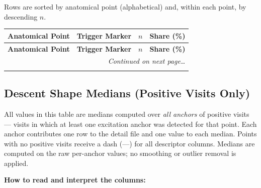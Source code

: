 \documentclass[a4paper,11pt]{article}
\begin{document}
\medskip
\noindent Rows are sorted by anatomical point (alphabetical) and, within each point, by
descending $n$.

\begin{footnotesize}
\begin{longtable}{p{3.5cm}p{7.5cm}rr}
\toprule
\textbf{Anatomical Point} &
\textbf{Trigger Marker} &
\textbf{$n$} &
\textbf{Share (\%)} \\
\midrule
\endfirsthead
\toprule
\textbf{Anatomical Point} &
\textbf{Trigger Marker} &
\textbf{$n$} &
\textbf{Share (\%)} \\
\midrule
\endhead
\midrule
\multicolumn{4}{r}{\footnotesize\emph{Continued on next page\ldots}} \\
\endfoot
\bottomrule
\endlastfoot

\end{longtable}
\end{footnotesize}

\subsection{Descent Shape Medians (Positive Visits Only)}

All values in this table are medians computed over \emph{all anchors} of positive visits ---
visits in which at least one excitation anchor was detected for that point. Each anchor
contributes one row to the detail file and one value to each median. Points with no positive
visits receive a dash (---) for all descriptor columns.
Medians are computed on the raw per-anchor values; no smoothing or outlier removal is
applied.

\medskip
\noindent\textbf{How to read and interpret the columns:}
\end{document}
